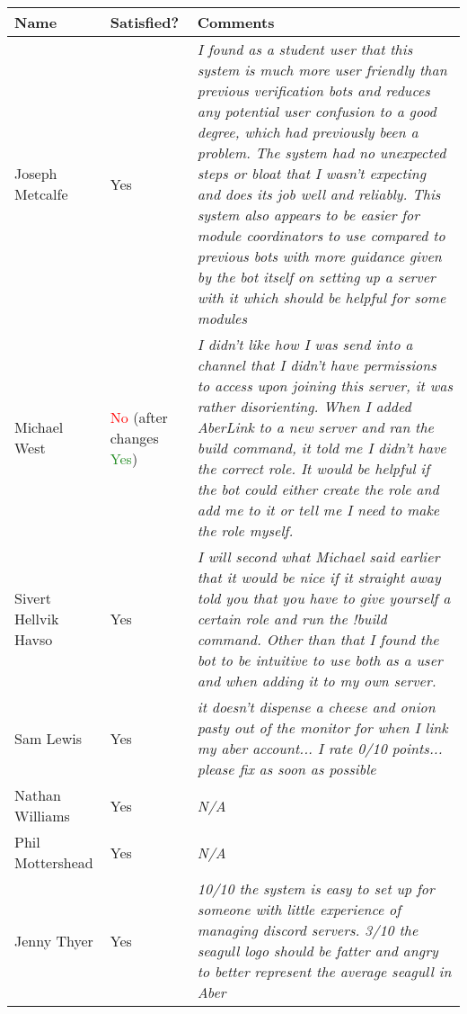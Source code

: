 \begin{table}[H]
    \centering
    \begin{tabular}{|p{2cm}|p{2cm}|p{10cm}|}
        \hline
        Name & Satisfied? & Comments \\
        \hline
        Joseph Metcalfe & \color{ForestGreen}Yes & \textit{I found as a student user that this system is much more user friendly than previous verification bots and reduces any potential user confusion to a good degree, which had previously been a problem. The system had no unexpected steps or bloat that I wasn't expecting and does its job well and reliably.  This system also appears to be easier for module coordinators to use compared to previous bots with more guidance given by the bot itself on setting up a server with it which should be helpful for some modules} \\
        \hline
        Michael West & \textcolor{red}{No} (after changes \textcolor{ForestGreen}{Yes}) & \textit{I didn't like how I was send into a channel that I didn't have permissions to access upon joining this server, it was rather disorienting. When I added AberLink to a new server and ran the build command, it told me I didn't have the correct role. It would be helpful if the bot could either create the role and add me to it or tell me I need to make the role myself.} \\
        \hline
        Sivert Hellvik Havso & \color{ForestGreen}Yes & \textit{I will second what Michael said earlier that it would be nice if it straight away told you that you have to give yourself a certain role and run the !build command. Other than that I found the bot to be intuitive to use both as a user and when adding it to my own server.} \\
        \hline
        Sam Lewis & \color{ForestGreen}Yes & \textit{it doesn't dispense a cheese and onion pasty out of the monitor for when I link my aber account... I rate 0/10 points... please fix as soon as possible} \\
        \hline
        Nathan Williams & \color{ForestGreen}Yes & \textit{N/A} \\
        \hline
        Phil Mottershead & \color{ForestGreen}Yes & \textit{N/A} \\
        \hline
        Jenny Thyer & \color{ForestGreen}Yes & \textit{10/10 the system is easy to set up for someone with little experience of managing discord servers. 3/10 the seagull logo should be fatter and angry to better represent the average seagull in Aber} \\

\end{tabular}
\end{table}
